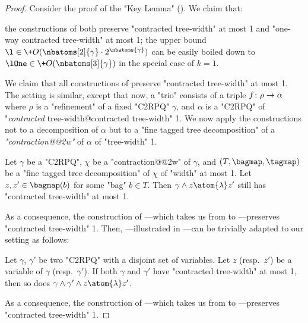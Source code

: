 \begin{proof}
	Consider the proof of the "Key Lemma" ().
	We claim that:
	\begin{enumerate}
		\itemAP the constructions of
			both preserve "contracted tree-width" at most 1 and "one-way contracted tree-width" at most 1;
			\label{eq:lemma:bound_size_refinements_tw:1}
		\itemAP the upper bound
			$\l \in \+O(\nbatoms[2]{\gamma} \cdot 2^{\nbatoms{\gamma}})$
			can be easily boiled down to $\lOne \in \+O(\nbatoms[3]{\gamma})$ in the special case of $k=1$.
			\label{eq:lemma:bound_size_refinements_tw:2}
	\end{enumerate}

	\smallskip

	We claim that all constructions of  preserve "contracted tree-width" 
	at most 1. The setting is similar, except that now, a "trio" consists of a triple $f\colon \rho \to 
	\alpha$ where $\rho$ is a "refinement" of a fixed "C2RPQ" $\gamma$, and $\alpha$ is a "C2RPQ" of
	"\emph{contracted} tree-width@contracted tree-width" 1. We now apply the constructions not to a decomposition of $\alpha$ but to a "fine tagged tree decomposition" of a \emph{"contraction@@2w"} of $\alpha$ of "tree-width" 1.
	
	\begin{fact}
		Let $\gamma$ be a "C2RPQ", $\chi$ be a "contraction@@2w" of $\gamma$, and
		$(T, \bagmap, \tagmap)$ be a "fine tagged tree decomposition" of $\chi$ of "width" at most 1.
		Let $z, z' \in \bagmap(b)$ for some "bag" $b \in T$. Then $\gamma \land z \atom{\lambda} z'$
		still has "contracted tree-width" at most 1.
	\end{fact}
	As a consequence, the construction of ---which takes us from  to ---preserves "contracted tree-width" 1.
	Then, ---illustrated in ---can be trivially adapted to our setting as follows:
	\begin{fact}
		Let $\gamma$, $\gamma'$ be two "C2RPQ" with a disjoint set of variables.
		Let $z$ (resp.\ $z'$) be a variable of $\gamma$ (resp.\ $\gamma'$).
		If both $\gamma$ and $\gamma'$ have "contracted tree-width" at most 1, then so does
		$\gamma \land \gamma' \land z \atom{\lambda} z'$.
	\end{fact}
	As a consequence, the construction of ---which takes us from 
	 to ---preserves "contracted tree-width" 1. 


\end{proof}
